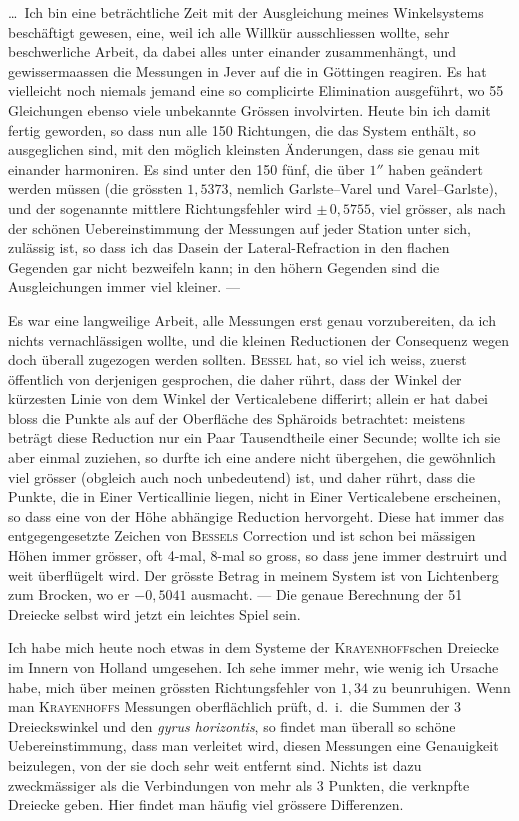 \documentclass[12pt,a4paper]{article}
\theoremstyle{plain}
\theoremstyle{definition}
\theoremstyle{remark}
\begin{document}
\ldots\ Ich bin eine betr\"achtliche Zeit mit der Ausgleichung meines Winkelsystems besch\"aftigt gewesen, eine, weil ich alle Willk\"ur ausschliessen wollte, sehr beschwerliche Arbeit, da dabei alles unter einander zusammenh\"angt, und gewissermaassen die Messungen in Jever auf die in G\"ottingen reagiren. Es hat vielleicht noch niemals jemand eine so complicirte Elimination ausgef\"uhrt, wo 55 Gleichungen ebenso viele unbekannte Gr\"ossen involvirten. Heute bin ich damit fertig geworden, so dass nun alle 150 Richtungen, die das System enth\"alt, so ausgeglichen sind, mit den m\"oglich kleinsten \"Anderungen, dass sie genau mit einander harmoniren. Es sind unter den 150 f\"unf, die \"uber $1''$ haben ge\"andert werden m\"ussen (die gr\"ossten $1{,}5373$, nemlich Garlste--Varel und Varel--Garlste), und der sogenannte mittlere Richtungsfehler wird $\pm\,0{,}5755$, viel gr\"osser, als nach der sch\"onen Uebereinstimmung der Messungen auf jeder Station unter sich, zul\"assig ist, so dass ich das Dasein der Lateral-Refraction in den flachen Gegenden gar nicht bezweifeln kann; in den h\"ohern Gegenden sind die Ausgleichungen immer viel kleiner. ---

Es war eine langweilige Arbeit, alle Messungen erst genau vorzubereiten, da ich nichts vernachl\"assigen wollte, und die kleinen Reductionen der Consequenz wegen doch \"uberall zugezogen werden sollten. \textsc{Bessel} hat, so viel ich weiss, zuerst \"offentlich von derjenigen gesprochen, die daher r\"uhrt, dass der Winkel der k\"urzesten Linie von dem Winkel der Verticalebene differirt; allein er hat dabei bloss die Punkte als auf der Oberfl\"ache des Sph\"aroids betrachtet: meistens betr\"agt diese Reduction nur ein Paar Tausendtheile einer Secunde; wollte ich sie aber einmal zuziehen, so durfte ich eine andere nicht \"ubergehen, die gew\"ohnlich viel gr\"osser (obgleich auch noch unbedeutend) ist, und daher r\"uhrt, dass die Punkte, die in Einer Verticallinie liegen, nicht in Einer Verticalebene erscheinen, so dass eine von der H\"ohe abh\"angige Reduction hervorgeht. Diese hat immer das entgegengesetzte Zeichen von \textsc{Bessels} Correction und ist schon bei m\"assigen H\"ohen immer gr\"osser, oft 4-mal, 8-mal so gross, so dass jene immer destruirt und weit \"uberfl\"ugelt wird. Der gr\"osste Betrag in meinem System ist von Lichtenberg zum Brocken, wo er $-0{,}5041$ ausmacht. --- Die genaue Berechnung der 51 Dreiecke selbst wird jetzt ein leichtes Spiel sein.

Ich habe mich heute noch etwas in dem Systeme der \textsc{Krayenhoff}schen Dreiecke im Innern von Holland umgesehen. Ich sehe immer mehr, wie wenig ich Ursache habe, mich \"uber meinen gr\"ossten Richtungsfehler von $1{,}34$ zu beunruhigen. Wenn man \textsc{Krayenhoffs} Messungen oberfl\"achlich pr\"uft, d.\ i.\ die Summen der 3 Dreieckswinkel und den \textit{gyrus horizontis}, so findet man \"uberall so sch\"one Uebereinstimmung, dass man verleitet wird, diesen Messungen eine Genauigkeit beizulegen, von der sie doch sehr weit entfernt sind. Nichts ist dazu zweckm\"assiger als die Verbindungen von mehr als 3 Punkten, die verknpfte Dreiecke geben. Hier findet man h\"aufig viel gr\"ossere Differenzen.
\end{document}
